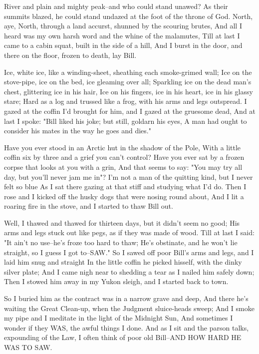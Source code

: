 \begin{poemblock}
 River and plain and mighty peak--and who could stand unawed?
 As their summits blazed, he could stand undazed
   at the foot of the throne of God.
 North, aye, North, through a land accurst, shunned by the scouring brutes,
 And all I heard was my own harsh word and the whine of the malamutes,
 Till at last I came to a cabin squat, built in the side of a hill,
 And I burst in the door, and there on the floor, frozen to death, lay Bill.

 Ice, white ice, like a winding-sheet, sheathing each smoke-grimed wall;
 Ice on the stove-pipe, ice on the bed, ice gleaming over all;
 Sparkling ice on the dead man's chest, glittering ice in his hair,
 Ice on his fingers, ice in his heart, ice in his glassy stare;
 Hard as a log and trussed like a frog, with his arms and legs outspread.
 I gazed at the coffin I'd brought for him,
   and I gazed at the gruesome dead,
 And at last I spoke:  "Bill liked his joke; but still, goldarn his eyes,
 A man had ought to consider his mates in the way he goes and dies."

 Have you ever stood in an Arctic hut in the shadow of the Pole,
 With a little coffin six by three and a grief you can't control?
 Have you ever sat by a frozen corpse that looks at you with a grin,
 And that seems to say:  "You may try all day, but you'll never jam me in"?
 I'm not a man of the quitting kind, but I never felt so blue
 As I sat there gazing at that stiff and studying what I'd do.
 Then I rose and I kicked off the husky dogs that were nosing round about,
 And I lit a roaring fire in the stove, and I started to thaw Bill out.

 Well, I thawed and thawed for thirteen days, but it didn't seem no good;
 His arms and legs stuck out like pegs, as if they was made of wood.
 Till at last I said:  "It ain't no use--he's froze too hard to thaw;
 He's obstinate, and he won't lie straight, so I guess I got to--SAW."
 So I sawed off poor Bill's arms and legs, and I laid him snug and straight
 In the little coffin he picked hisself, with the dinky silver plate;
 And I came nigh near to shedding a tear as I nailed him safely down;
 Then I stowed him away in my Yukon sleigh, and I started back to town.

 So I buried him as the contract was in a narrow grave and deep,
 And there he's waiting the Great Clean-up,
   when the Judgment sluice-heads sweep;
 And I smoke my pipe and I meditate in the light of the Midnight Sun,
 And sometimes I wonder if they WAS, the awful things I done.
 And as I sit and the parson talks, expounding of the Law,
 I often think of poor old Bill--AND HOW HARD HE WAS TO SAW.
\end{poemblock}
